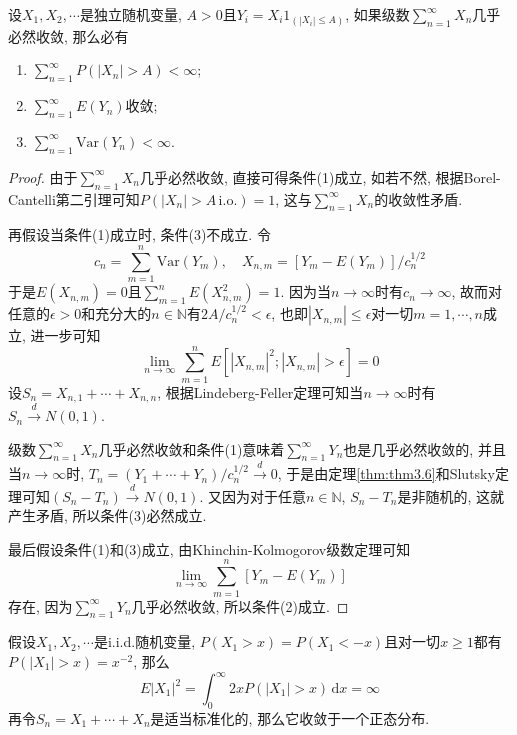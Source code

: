 \documentclass[cn, 12pt, math=mtpro2, bibstyle=apa, blue, twocol]{elegantbook}
\newcommand{\limn}{\lim_{n\to\infty}}
\begin{document}
\begin{example}[$\,$Kolvmogorov三级数定理的必要条件]
 设$X_1,X_2,\cdots$是独立随机变量, $A>0$且$Y_i=X_i1_{(|X_i|\leq A)}$, 如果级数$\sum_{n=1}^{\infty}X_n$几乎必然收敛, 那么必有
  \begin{enumerate}[label=(\arabic*)]
    \item $\sum_{n=1}^{\infty}P(|X_n|>A)<\infty$;
    \item $\sum_{n=1}^{\infty}E(Y_n)$收敛;
    \item $\sum_{n=1}^{\infty}\text{Var}(Y_n)<\infty$.
  \end{enumerate}
\end{example}
\begin{proof}
  由于$\sum_{n=1}^{\infty}X_n$几乎必然收敛, 直接可得条件(1)成立, 如若不然, 根据Borel-Cantelli第二引理可知$P(|X_n|>A\,\text{i.o.})=1$, 这与$\sum_{n=1}^{\infty}X_n$的收敛性矛盾.

  再假设当条件(1)成立时, 条件(3)不成立. 令
  $$c_n=\sum_{m=1}^{n}\text{Var}(Y_m),\quad X_{n,m}=[Y_m-E(Y_m)]/c_n^{1/2}$$
  于是$E(X_{n,m})=0$且$\sum_{m=1}^{n}E(X_{n,m}^2)=1$. 因为当$n\to\infty$时有$c_n\to\infty$, 故而对任意的$\epsilon>0$和充分大的$n\in\mathbb{N}$有$2A/c_n^{1/2}<\epsilon$, 也即$|X_{n,m}|\leq\epsilon$对一切$m=1,\cdots,n$成立, 进一步可知
  $$\limn \sum_{m=1}^{n}E[|X_{n,m}|^2;|X_{n,m}|>\epsilon]=0$$
  设$S_n=X_{n,1}+\cdots+X_{n,n}$, 根据Lindeberg-Feller定理可知当$n\to\infty$时有
  $S_n\xrightarrow{d}N(0,1)$.

  级数$\sum_{n=1}^{\infty}X_n$几乎必然收敛和条件(1)意味着$\sum_{n=1}^{\infty}Y_n$也是几乎必然收敛的, 并且当$n\to\infty$时, $T_n=(Y_1+\cdots+Y_n)/c_n^{1/2}\xrightarrow{d} 0$, 于是由定理\ref{thm:thm3.6}和Slutsky定理可知$(S_n-T_n)\xrightarrow{d} N(0,1)$. 又因为对于任意$n\in\mathbb{N}$, $S_n-T_n$是非随机的, 这就产生矛盾, 所以条件(3)必然成立.

  最后假设条件(1)和(3)成立, 由Khinchin-Kolmogorov级数定理可知$$\limn \sum_{m=1}^{n}[Y_m-E(Y_m)]$$存在, 因为$\sum_{n=1}^{\infty}Y_n$几乎必然收敛, 所以条件(2)成立.
\end{proof}
\begin{example}[无限方差]
假设$X_1,X_2,\cdots$是i.i.d.随机变量, $P(X_1>x)=P(X_1<-x)$且对一切$x\ge1$都有$P(|X_1|>x)=x^{-2}$, 那么
$$E|X_1|^2=\int_{0}^{\infty}2xP(|X_1|>x)\,\text{d}x=\infty$$
再令$S_n=X_1+\cdots+X_n$是适当标准化的, 那么它收敛于一个正态分布.
\end{example}
\end{document}
